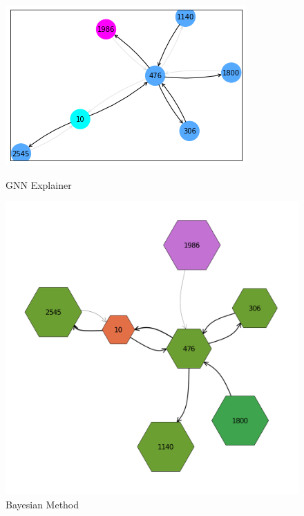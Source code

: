\documentclass[11pt]{article}
\begin{document}
\begin{figure}[h!]
	\centering
	\begin{minipage}{0.5\textwidth}
        \centering
        \includegraphics[width=\textwidth]{gnn_exp} 
        \caption{GNN Explainer}
    \end{minipage}\hfill
    \begin{minipage}{0.5\textwidth}
        \centering
        \includegraphics[width=\textwidth]{bayes}
        \caption{Bayesian Method}
    \end{minipage}	
\end{figure}
\end{document}
